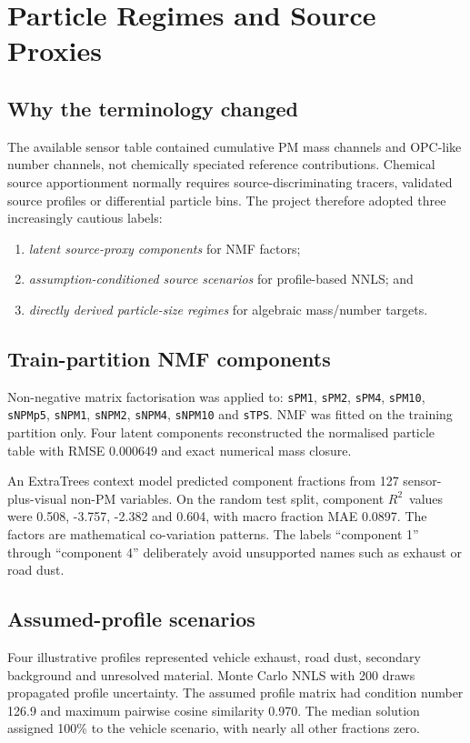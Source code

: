 \documentclass[11pt,a4paper,oneside]{report}
\newcommand{\Rtwo}{$R^2$}
\begin{document}
\chapter{Particle Regimes and Source Proxies}

\section{Why the terminology changed}
The available sensor table contained cumulative PM mass channels and OPC-like
number channels, not chemically speciated reference contributions. Chemical
source apportionment normally requires source-discriminating tracers, validated
source profiles or differential particle bins. The project therefore adopted
three increasingly cautious labels:
\begin{enumerate}
  \item \emph{latent source-proxy components} for NMF factors;
  \item \emph{assumption-conditioned source scenarios} for profile-based NNLS;
        and
  \item \emph{directly derived particle-size regimes} for algebraic mass/number
        targets.
\end{enumerate}

\section{Train-partition NMF components}
Non-negative matrix factorisation was applied to:
\texttt{sPM1}, \texttt{sPM2}, \texttt{sPM4}, \texttt{sPM10},
\texttt{sNPMp5}, \texttt{sNPM1}, \texttt{sNPM2}, \texttt{sNPM4},
\texttt{sNPM10} and \texttt{sTPS}. NMF was fitted on the training partition
only. Four latent components reconstructed the normalised particle table with
RMSE 0.000649 and exact numerical mass closure.

An ExtraTrees context model predicted component fractions from 127
sensor-plus-visual non-PM variables. On the random test split, component \Rtwo\
values were 0.508, -3.757, -2.382 and 0.604, with macro fraction MAE 0.0897.
The factors are mathematical co-variation patterns. The labels
``component 1'' through ``component 4'' deliberately avoid unsupported names
such as exhaust or road dust.

\section{Assumed-profile scenarios}
Four illustrative profiles represented vehicle exhaust, road dust, secondary
background and unresolved material. Monte Carlo NNLS with 200 draws propagated
profile uncertainty. The assumed profile matrix had condition number 126.9 and
maximum pairwise cosine similarity 0.970. The median solution assigned 100\%
to the vehicle scenario, with nearly all other fractions zero.
\end{document}
